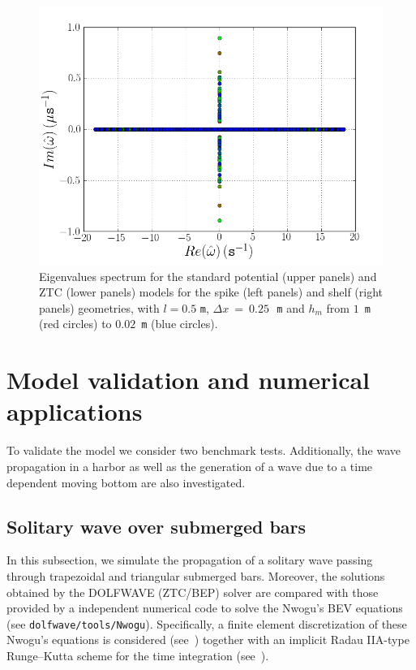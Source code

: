 \begin{figure}
\begin{center}
\includegraphics[type=png,ext=.png,read=.png,width=\smallfig]{chapters/lopes/png/L_0.5_dx_0.25_hm_shelf_spectrum_Zhao}
\end{center}
\caption{Eigenvalues spectrum for the standard potential
 (upper panels) and ZTC (lower panels)
 models for the spike (left panels) and
 shelf (right panels) geometries, with  $l=0.5$ {\tt m},
 $\Delta x~=~0.25$\,~{\tt m} and $h_m$ from $1$~{\tt m} (red circles)
 to $0.02$~{\tt m} (blue circles).}
 \label{fig:lopes:spectrumhm3}
 \end{figure}


\section{Model validation and numerical applications}\label{sec:lopes:numericaltests}
To validate the model  we consider two benchmark tests.
Additionally, the wave propagation in a harbor as well as the
generation of a wave due to a time dependent  moving bottom
are also investigated.

\subsection{Solitary wave over  submerged bars}
In this subsection, we simulate the propagation of a
solitary wave passing through  trapezoidal and  triangular
submerged bars.
Moreover,
the solutions obtained by the DOLFWAVE (ZTC/BEP) solver are
compared with those provided by a \fenics independent
numerical code to solve the Nwogu's BEV equations (see
{\tt dolfwave/tools/Nwogu}).  Specifically, a finite element
discretization of these Nwogu's equations is considered
(see~\citet{Walkley1999}) together with an
implicit Radau IIA-type Runge--Kutta scheme
 for the time integration (see~\citet{HairerWanner1991b}).


